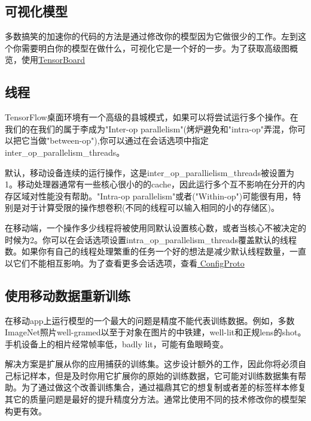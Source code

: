 \subsection{可视化模型}
多数搞笑的加速你的代码的方法是通过修改你的模型因为它做很少的工作。左到这个你需要明白你的模型在做什么，可视化它是一个好的一步。为了获取高级图概览，使用\href{https://github.com/tensorflow/tensorboard}{TensorBoard}
\subsection{线程}
TensorFlow桌面环境有一个高级的县城模式，如果可以将尝试运行多个操作。在我们的在我们的属于李成为"Inter-op parallelism"(烤炉避免和"intra-op"弄混，你可以把它当做"between-op"),你可以通过在会话选项中指定inter\_op\_parallelism\_threads。

默认，移动设备连续的运行操作，这是inter\_op\_parallielism\_threads被设置为1。移动处理器通常有一些核心很小的的cache，因此运行多个互不影响在分开的内存区域对性能没有帮助。"Intra-op parallelism"或者("Within-op")可能很有用，特别是对于计算受限的操作想卷积(不同的线程可以输入相同的小的存储区)。

在移动端，一个操作多少线程将被使用同默认设置核心数，或者当核心不被决定的时候为2。你可以在会话选项设置intra\_op\_parallelism\_threads覆盖默认的线程数。如果你有自己的线程处理繁重的任务一个好的想法是减少默认线程数量，一直以它们不能相互影响。为了查看更多会话选项，查看\href{https://www.github.com/tensorflow/tensorflow/blob/r1.4/tensorflow/core/protobuf/config.proto}{ ConfigProto}
\subsection{使用移动数据重新训练}
在移动app上运行模型的一个最大的问题是精度不能代表训练数据。例如，多数ImageNet照片well-gramed以至于对象在图片的中铁建，well-lit和正规lens的shot。手机设备上的相片经常帧率低，badly lit，可能有鱼眼畸变。

解决方案是扩展从你的应用捕获的训练集。这步设计额外的工作，因此你将必须自己标记样本，但是及时你用它扩展你的原始的训练数据，它可能对训练数据集有帮助。为了通过做这个改善训练集合，通过福鼎其它的想复制或者差的标签样本修复其它的质量问题是最好的提升精度分方法。通常比使用不同的技术修改你的模型架构更有效。
